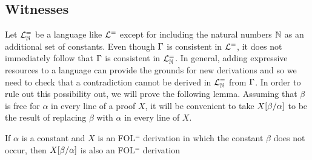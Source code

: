 \subsection{Witnesses}%
  \label{sub:Witnesses}
  

Let $\mathcal{L}^{=}_{\mathbb{N}}$ be a language like $\mathcal{L}^{=}$ except for including the natural numbers $\mathbb{N}$ as an additional set of constants.
Even though $\Gamma$ is consistent in $\mathcal{L}^{=}$, it does not immediately follow that $\Gamma$ is consistent in $\mathcal{L}^{=}_{\mathbb{N}}$.
In general, adding expressive resources to a language can provide the grounds for new derivations and so we need to check that a contradiction cannot be derived in $\mathcal{L}^{=}_{\mathbb{N}}$ from $\Gamma$.
In order to rule out this possibility out, we will prove the following lemma.
Assuming that $\beta$ is free for $\alpha$ in every line of a proof $X$, it will be convenient to take $X[\beta/\alpha]$ to be the result of replacing $\beta$ with $\alpha$ in every line of $X$.

%

\begin{Lthm} \label{lemma:prsub}
  If $\alpha$ is a constant and $X$ is an FOL$^=$ derivation in which the constant $\beta$ does not occur, then $X[\beta/\alpha]$ is also an FOL$^=$ derivation 
\end{Lthm}

